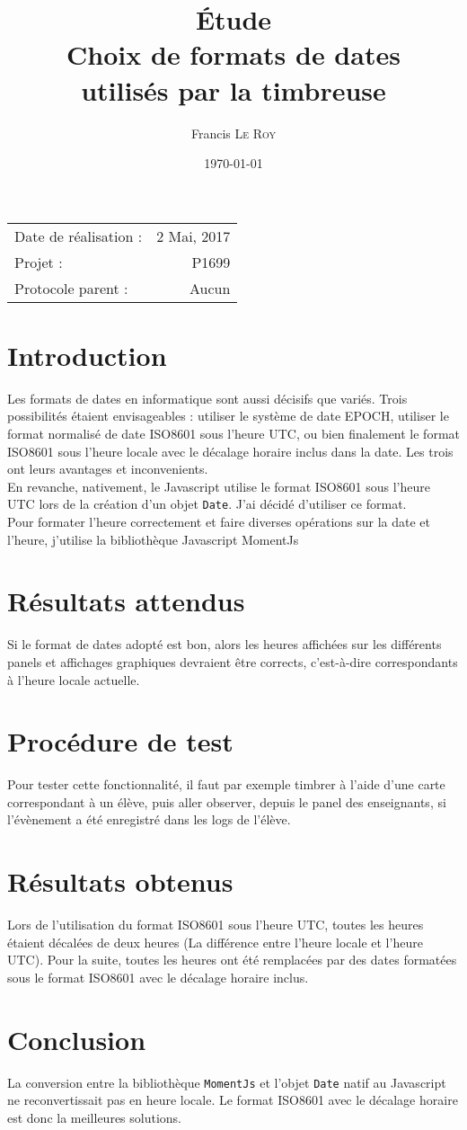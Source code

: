 \documentclass[10pt,a4paper,onecolumn]{article}
\title{Étude \\ Choix de formats de dates \\ utilisés par la timbreuse}
\author{Francis \textsc{Le Roy}}
\date{\today}
\begin{document}
\maketitle
\thispagestyle{fancy}

\begin{center}
\begin{tabular}{l r}
Date de réalisation : & 2 Mai, 2017 \\
Projet : & P1699 \\
Protocole parent : & Aucun
\end{tabular}
\end{center}

\section{Introduction}
Les formats de dates en informatique sont aussi décisifs que variés. Trois possibilités étaient envisageables :  utiliser le système de date EPOCH, utiliser le format normalisé de date ISO8601 \cite{isodate} sous l'heure UTC, ou bien finalement le format ISO8601 sous l'heure locale avec le décalage horaire inclus dans la date. Les trois ont leurs avantages et inconvenients. \\
En revanche, nativement, le Javascript utilise le format ISO8601 sous l'heure UTC lors de la création d'un objet \texttt{Date}. J'ai décidé d'utiliser ce format. \\
Pour formater l'heure correctement et faire diverses opérations sur la date et l'heure, j'utilise la bibliothèque Javascript MomentJs \cite{momentjs}
\section{Résultats attendus}
Si le format de dates adopté est bon, alors les heures affichées sur les différents panels et affichages graphiques devraient être corrects, c'est-à-dire correspondants à l'heure locale actuelle.
\section{Procédure de test}
Pour tester cette fonctionnalité, il faut par exemple timbrer à l'aide d'une carte correspondant à un élève, puis aller observer, depuis le panel des enseignants, si l'évènement a été enregistré dans les logs de l'élève.
\section{Résultats obtenus}
Lors de l'utilisation du format ISO8601 sous l'heure UTC, toutes les heures étaient décalées de deux heures (La différence entre l'heure locale et l'heure UTC). Pour la suite, toutes les heures ont été remplacées par des dates formatées sous le format ISO8601 avec le décalage horaire inclus.
\section{Conclusion}
La conversion entre la bibliothèque \texttt{MomentJs} et l'objet \texttt{Date} natif au Javascript ne reconvertissait pas en heure locale. Le format ISO8601 avec le décalage horaire est donc la meilleures solutions.

\printbibliography
\end{document}
